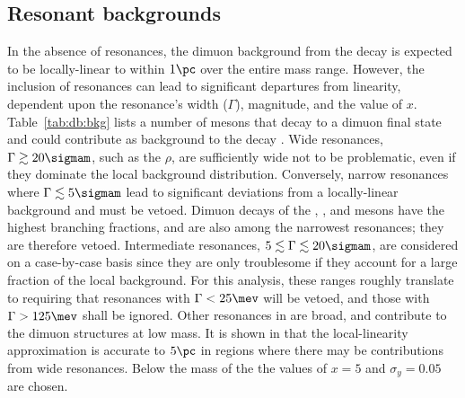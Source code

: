 \subsection{Resonant backgrounds}
In the absence of resonances,
the dimuon background from the \sm decay \btokstrmumu is expected to be locally-linear
to within $1\pc$ over the entire mass range.
However, the inclusion of resonances can lead to significant departures from linearity, dependent
upon the resonance's width ($\Gamma$), magnitude, and the value of $x$.
Table~\ref{tab:db:bkg} lists a number of mesons that decay to a dimuon final state and could
contribute as background to the decay \decay{\Bd}{\Kstarz\mumu}.
Wide resonances, $\Gamma\gtrsim20\sigmam$, such as the $\rho$,
are sufficiently wide not to be problematic, even if they dominate the local background
distribution.
Conversely, narrow resonances where $\Gamma\lesssim5\sigmam$ lead to significant deviations from a
locally-linear background and must be vetoed.
Dimuon decays of the \phii, \jpsi, and \psitwos mesons have the highest branching fractions, and
are also among the
narrowest resonances; they are therefore vetoed.
Intermediate resonances, $5\lesssim\Gamma\lesssim20\sigmam$, are considered on a case-by-case
basis since they are only troublesome if they account for a large fraction of the local background.
For this analysis, these ranges roughly translate to requiring that resonances with $\Gamma<25\mev$
will be vetoed, and those with $\Gamma>125\mev$ shall be ignored.
Other resonances in  are broad, and contribute to the dimuon
structures at low mass.
It is shown in  that the local-linearity approximation is accurate to
\approx$5\pc$ in regions where there may be contributions from wide resonances.
Below the mass of the \jpsi the values of $x=5$ and $\sigma_y=0.05$ are chosen.

